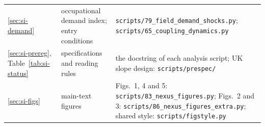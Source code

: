 \documentclass[11pt]{article}
\begin{document}
\begin{longtable}{@{}>{\raggedright\arraybackslash}p{2.7cm}>{\raggedright\arraybackslash}p{4.3cm}>{\raggedright\arraybackslash}p{8.8cm}@{}}
\ref{sec:si-demand} & occupational demand index; entry conditions & \nolinkurl{scripts/79_field_demand_shocks.py}; \nolinkurl{scripts/65_coupling_dynamics.py} \\
\ref{sec:si-prereg}, Table~\ref{tab:si-status} & specifications and reading rules & the docstring of each analysis script; UK slope design: \nolinkurl{scripts/prespec/} \\
\ref{sec:si-figs} & main-text figures & Figs.~1, 4 and 5: \nolinkurl{scripts/83_nexus_figures.py}; Figs.~2 and 3: \nolinkurl{scripts/86_nexus_figures_extra.py}; shared style: \nolinkurl{scripts/figstyle.py} \\
\end{longtable}
\endgroup



\end{document}
